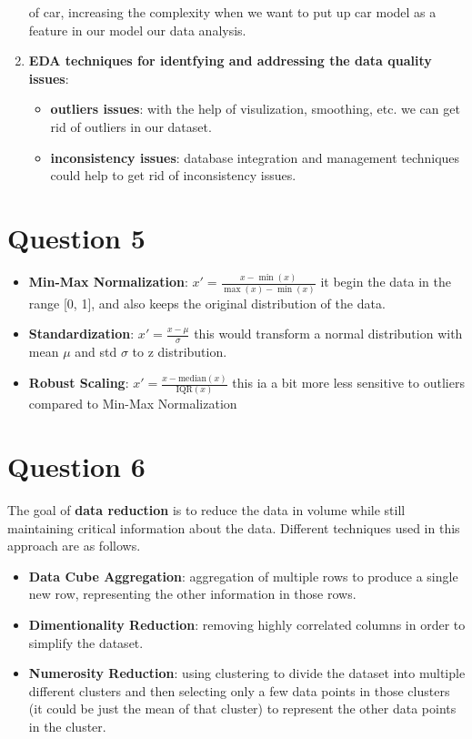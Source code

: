 \documentclass[a4paper,12pt]{article}
\begin{document}
\begin{enumerate}
    of car, increasing the complexity when we want to put up car model as a feature in our model our data analysis.
    \item \textbf{EDA techniques for identfying and addressing the data quality issues}:
    \begin{itemize}
        \item \textbf{outliers issues}: with the help of visulization, smoothing, etc. we can get rid of outliers in our dataset. 
        \item \textbf{inconsistency issues}: database integration and management techniques could help to get rid of inconsistency issues. 
    \end{itemize}
\end{enumerate}

\section*{Question 5}
\begin{itemize}
    \item \textbf{Min-Max Normalization}: 
    \( x' = \frac{x - \min(x)}{\max(x) - \min(x)} \) 
    it begin the data in the range [0, 1], and also keeps the original distribution of the data.
    \item \textbf{Standardization}:
    \( x' = \frac{x - \mu}{\sigma} \) 
    this would transform a normal distribution with mean $\mu$ and std $\sigma$ to z distribution. 
    \item \textbf{Robust Scaling}:
    \( x' = \frac{x - \text{median}(x)}{\text{IQR}(x)} \)
    this ia a bit more less sensitive to outliers compared to Min-Max Normalization
\end{itemize}

\section*{Question 6}
The goal of \textbf{data reduction} is to reduce the data in volume while still maintaining critical information about the data. Different techniques used in this approach are as follows.
\begin{itemize}
    \item \textbf{Data Cube Aggregation}: aggregation of multiple rows to produce a single new row, representing the other information in those rows.
    \item \textbf{Dimentionality Reduction}: removing highly correlated columns in order to simplify the dataset.
    \item \textbf{Numerosity Reduction}: using clustering to divide the dataset into multiple different clusters and then selecting only a few data points in those clusters (it could be just the mean of that cluster) to represent the other data points in the cluster.
\end{itemize}
\end{document}
